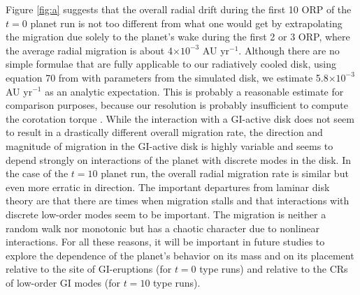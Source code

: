 \documentclass[12pt,manuscript,authoryear]{aastex}
\begin{document}
Figure \ref{fig:a} suggests that the overall radial drift during the first 10 ORP of the $t = 0$ planet run is not too different from what one would get by extrapolating the migration due solely to the planet's wake during the first 2 or 3 ORP, where the average radial migration is about 4$\times10^{-3}$ AU yr$^{-1}$. Although there are no simple formulae that are fully applicable to our radiatively cooled disk, using equation 70 from \citet{tanaka2002} with parameters from the simulated disk, we estimate 5.8$\times10^{-3}$ AU yr$^{-1}$ as an analytic expectation. This is probably a reasonable estimate for comparison purposes, because our resolution is probably insufficient to compute the corotation torque \citep{paardekooper2010}. 
While the interaction with a GI-active disk does not seem to result in a drastically different overall migration rate, the direction and magnitude of migration in the GI-active disk is highly variable and seems to depend strongly on interactions of the planet with discrete modes in the disk. In the case of the $t = 10$ planet run, the overall radial migration rate is similar but even more erratic in direction. The important departures from laminar disk theory are that there are times when migration stalls and that interactions with discrete low-order modes seem to be important. The migration is neither a random walk nor monotonic but has a chaotic character due to nonlinear interactions. For all these reasons, it will be important in future studies to explore the dependence of the planet's behavior on its mass and on its placement relative to the site of GI-eruptions (for $t = 0$ type runs) and relative to the CRs of low-order GI modes (for $t = 10$ type runs).
\end{document}
